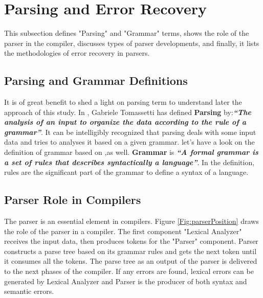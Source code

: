 \section{Parsing and Error Recovery}
\label{sec:bck_parser}
This subsection defines "Parsing" and "Grammar" terms, shows the role of the parser in the compiler, discusses types of parser developments, and finally, it lists the methodologies of error recovery in parsers. 
\subsection{Parsing and Grammar Definitions}
It is of great benefit to shed a light on parsing term to understand later the approach of this study. In \cite{parsingGuide2017}, Gabriele Tomassetti has defined \textbf{Parsing} by:{\it  \textbf{``The analysis of an input to organize the data according to the rule of a grammar''}}. It can be intelligibly recognized that parsing deals with some input data and tries to analyses it based on a given grammar. let's have a look on the definition of grammar based on  \cite{parsingGuide2017},as well. \textbf{Grammar} is 
{\it \textbf{``A formal grammar is a set of rules that describes syntactically a language''}}. In the definition, rules are the significant part of the grammar to define a syntax of a language.  
\subsection{Parser Role in Compilers}
The parser is an essential element in  compilers. {Figure \ref{Fig:parserPosition}} draws the role of the parser in a compiler. The first component "Lexical Analyzer" receives the input data, then produces tokens for  the "Parser" component. Parser constructs a parse tree based on its grammar rules and gets the next token until it consumes all the tokens. The parse tree as an output of the parser is delivered to the next phases of the compiler. If any errors are found, lexical errors can be generated by Lexical Analyzer and Parser is the producer of both syntax and semantic errors. 

